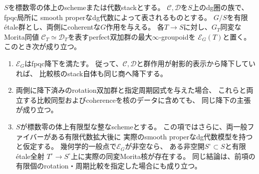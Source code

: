 \begin{proposition}[同変Morita核のstackと有限被覆]
\label{mbrd:prop:kernel-stack}
$S$を標数零の体上のschemeまたは代数stackとする。
$\mathcal C,\mathcal D$を$S$上のdg圏の族で、fpqc局所に
smooth properなdg代数によって表されるものとする。
$G/S$を有限\'etale群とし、両側にcoherentな$G$作用を与える。
各$T\to S$に対し、$G_T$同変なMorita同値
$\mathcal C_T\simeq\mathcal D_T$を表すperfect双加群の最大$\infty$-groupoidを
$\mathscr E_G(T)$と置く。このとき次が成り立つ。
\begin{enumerate}
\item $\mathscr E_G$はfpqc降下を満たす。
従って、$\mathcal C,\mathcal D$と群作用が射影的表示から降下していれば、
比較核のstack自体も同じ商へ降下する。
\item 両側に降下済みのrotation双加群と指定周期図式を与えた場合、
これらと両立する比較同型およびcoherenceを核のデータに含めても、
同じ降下の主張が成り立つ。
\item $S$が標数零の体上有限型な整なschemeとする。
この項ではさらに、両一般ファイバーがある有限代数拡大後に
実際のsmooth properなdg代数模型を持つと仮定する。
幾何学的一般点で$\mathscr E_G$が非空なら、
ある非空開$S^\circ\subset S$と有限\'etale全射
$T^\circ\to S^\circ$上に実際の同変Morita核が存在する。
同じ結論は、前項の有限個のrotation・周期比較を指定した場合にも成り立つ。
\end{enumerate}
\end{proposition}
